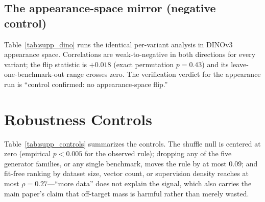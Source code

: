 \documentclass[runningheads]{llncs}
\begin{document}
\begin{table}[h]
\centering
\caption{$\epsilon$-radius coverage replication of the rule (per variant,
regime-grouped).}
\label{tab:supp_eps}
\scriptsize
\setlength{\tabcolsep}{3pt}

\end{table}

\subsection{The appearance-space mirror (negative control)}
Table~\ref{tab:supp_dino} runs the identical per-variant analysis in DINOv3
appearance space. Correlations are weak-to-negative in both directions for
every variant; the flip statistic is $+0.018$ (exact permutation $p{=}0.43$)
and its leave-one-benchmark-out range crosses zero. The verification verdict
for the appearance run is ``control confirmed: no appearance-space flip.''

\begin{table}[h]
\centering
\caption{The same analysis as main-paper Table~1, in appearance (DINO) space.
No direction carries usable signal (all $\rho \in [-0.35,-0.15]$) and the
aggregate flip is null ($+0.018$, $p{=}0.43$).}
\label{tab:supp_dino}
\scriptsize

\end{table}

\section{Robustness Controls}
\label{supp:robust}

Table~\ref{tab:supp_controls} summarizes the controls. The shuffle null is
centered at zero (empirical $p{<}0.005$ for the observed rule); dropping any
of the five generator families, or any single benchmark, moves the rule by at
most $0.09$; and fit-free ranking by dataset size, vector count, or
supervision density reaches at most $\rho{=}0.27$---``more data'' does not
explain the signal, which also carries the main paper's claim that off-target
mass is harmful rather than merely wasted.

\begin{table}[h]
\centering
\caption{Robustness controls for the fit-free rule.}
\label{tab:supp_controls}
\small

\end{table}

\end{document}
